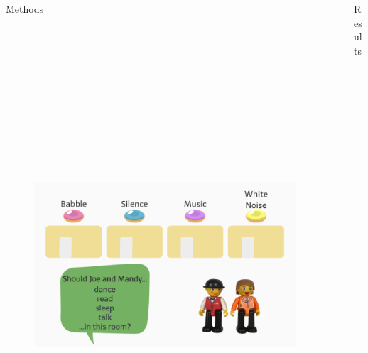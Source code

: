 \documentclass[final]{beamer}
\newlength{\sepwidth}
\newlength{\colwidth}
\newcommand{\separatorcolumn}{\begin{column}{\sepwidth}\end{column}}
\begin{document}
\begin{frame}[t]
\begin{columns}[t]
\begin{column}{\colwidth}
\begin{block}{Methods}
    \begin{figure}
      \includegraphics[width = 14in, height = 7in]{../writeup/figs/e3-stimuli-1.pdf}
    \end{figure}
  
  \end{block}

\end{column}

\separatorcolumn

\begin{column}{\colwidth}

  \begin{block}{Results}


\end{block}
\end{column}
\end{columns}
\end{frame}
\end{document}
